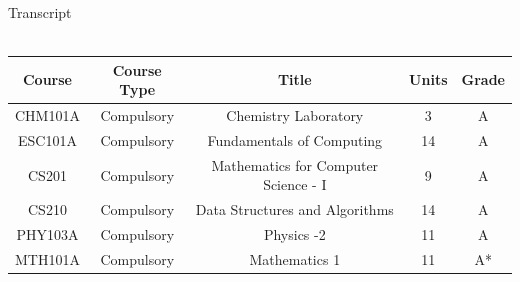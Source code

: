 \documentclass{article}
\begin{document}
\vspace{5 mm}
{\large Transcript}
\\ \\ \vspace{10 mm}
\begin{tabular}{ | c | c | c | c | c |}\hline
Course & Course Type & Title & Units & Grade \\\hline
CHM101A & Compulsory & Chemistry Laboratory & 3 & A\\\hline
ESC101A & Compulsory & Fundamentals of Computing & 14 & A\\\hline
CS201 & Compulsory & Mathematics for Computer Science - I & 9 & A\\\hline
CS210 & Compulsory & Data Structures and Algorithms  & 14 & A\\\hline
PHY103A & Compulsory & Physics -2 & 11 & A \\\hline
MTH101A & Compulsory & Mathematics 1 & 11 & A*\\\hline
\end{tabular}
\end{document}

